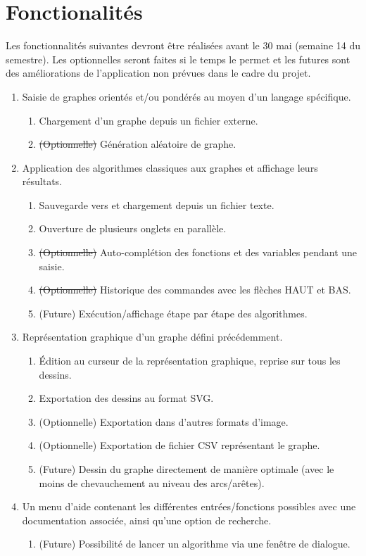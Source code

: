 \documentclass[french]{article}
\begin{document}
	\section{Fonctionalités}
		Les fonctionnalités suivantes devront être réalisées avant le 30 mai (semaine 14 du semestre). Les optionnelles seront faites si le temps le permet et les futures sont des améliorations de l'application non prévues dans le cadre du projet.
		\begin{enumerate}
			\item Saisie de graphes orientés et/ou pondérés au moyen d'un langage spécifique.
			\begin{enumerate}
				\item Chargement d'un graphe depuis un fichier externe.
				\item \sout{(Optionnelle)} Génération aléatoire de graphe.
			\end{enumerate}
			
			\item Application des algorithmes classiques aux graphes et affichage leurs résultats.
			\begin{enumerate}
				\item Sauvegarde vers et chargement depuis un fichier texte.
				\item Ouverture de plusieurs onglets en parallèle.
				\item \sout{(Optionnelle)} Auto-complétion des fonctions et des variables pendant une saisie.
				\item \sout{(Optionnelle)} Historique des commandes avec les flèches HAUT et BAS.
				\item (Future) Exécution/affichage étape par étape des algorithmes.
			\end{enumerate}
			
			\item Représentation graphique d'un graphe défini précédemment.
			\begin{enumerate}
				\item Édition au curseur de la représentation graphique, reprise sur tous les dessins.
				\item Exportation des dessins au format SVG.
				\item (Optionnelle) Exportation dans d'autres formats d'image.
				\item (Optionnelle) Exportation de fichier CSV représentant le graphe.
				\item (Future) Dessin du graphe directement de manière optimale (avec le moins de chevauchement au niveau des arcs/arêtes).
			\end{enumerate}
			
			\item Un menu d'aide contenant les différentes entrées/fonctions possibles avec une documentation associée, ainsi qu'une option de recherche.
			\begin{enumerate}
				\item (Future) Possibilité de lancer un algorithme via une fenêtre de dialogue.
			\end{enumerate}
		\end{enumerate}
		
\end{document}
